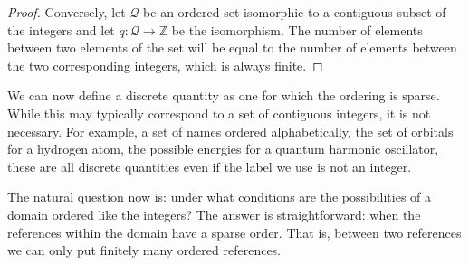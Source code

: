 \begin{mathSection}
\begin{proof}
		Conversely, let $\mathcal{Q}$ be an ordered set isomorphic to a contiguous subset of the integers and let $q : \mathcal{Q} \to \mathbb{Z}$ be the isomorphism. The number of elements between two elements of the set will be equal to the number of elements between the two corresponding integers, which is always finite.
	\end{proof}
	
\end{mathSection}

We can now define a discrete quantity as one for which the ordering is sparse. While this may typically correspond to a set of contiguous integers, it is not necessary. For example, a set of names ordered alphabetically, the set of orbitals for a hydrogen atom, the possible energies for a quantum harmonic oscillator, these are all discrete quantities even if the label we use is not an integer.

The natural question now is: under what conditions are the possibilities of a domain ordered like the integers? The answer is straightforward: when the references within the domain have a sparse order. That is, between two references we can only put finitely many ordered references.

